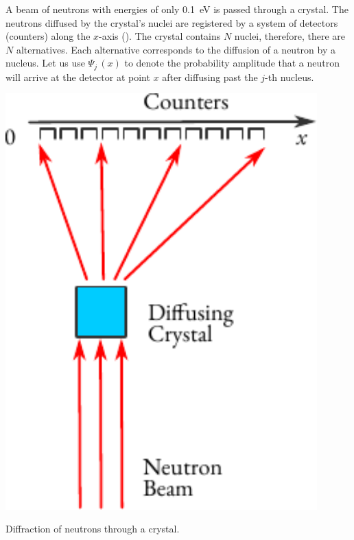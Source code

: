  A beam of neutrons with energies of only \SI{0.1}{\eV} is passed through a crystal. The neutrons diffused by the crystal's nuclei are registered by a system of detectors (counters) along the $x$-axis (). The crystal contains $N$ nuclei, therefore, there are $N$ alternatives. Each alternative corresponds to the diffusion of a neutron by a nucleus. Let us use $ \Psi_{j} \, (x)$ to denote the probability amplitude that a neutron will arrive at the detector at point $x$ after diffusing past the $j$-th nucleus.
\begin{marginfigure}%
\centering
\includegraphics[width=0.9\textwidth]{figures/neutron-diff.pdf}
\caption{Diffraction of neutrons through a crystal.\label{neutron-diff}}
\end{marginfigure}

